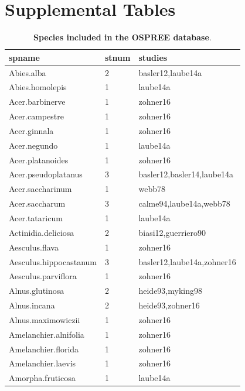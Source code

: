 \documentclass{article}
\begin{document}


\newpage
\section* {Supplemental Tables}
\begin{footnotesize} 
\begin{table}[ht]
\centering
\caption{\textbf{Species included in the OSPREE database}.
} 
\label{tab:sp}
\begingroup\footnotesize
\begin{tabular}{|p{}|p{}|p{}|}
  \hline
spname & stnum & studies \\ 
  \hline
Abies.alba &   2 & basler12,laube14a \\ 
  Abies.homolepis &   1 & laube14a \\ 
  Acer.barbinerve &   1 & zohner16 \\ 
  Acer.campestre &   1 & zohner16 \\ 
  Acer.ginnala &   1 & zohner16 \\ 
  Acer.negundo &   1 & laube14a \\ 
  Acer.platanoides &   1 & zohner16 \\ 
  Acer.pseudoplatanus &   3 & basler12,basler14,laube14a \\ 
  Acer.saccharinum &   1 & webb78 \\ 
  Acer.saccharum &   3 & calme94,laube14a,webb78 \\ 
  Acer.tataricum &   1 & laube14a \\ 
  Actinidia.deliciosa &   2 & biasi12,guerriero90 \\ 
  Aesculus.flava &   1 & zohner16 \\ 
  Aesculus.hippocastanum &   3 & basler12,laube14a,zohner16 \\ 
  Aesculus.parviflora &   1 & zohner16 \\ 
  Alnus.glutinosa &   2 & heide93,myking98 \\ 
  Alnus.incana &   2 & heide93,zohner16 \\ 
  Alnus.maximowiczii &   1 & zohner16 \\ 
  Amelanchier.alnifolia &   1 & zohner16 \\ 
  Amelanchier.florida &   1 & zohner16 \\ 
  Amelanchier.laevis &   1 & zohner16 \\ 
  Amorpha.fruticosa &   1 & laube14a \\ 

\end{tabular}
\end{table}
\end{footnotesize}
\end{document}
